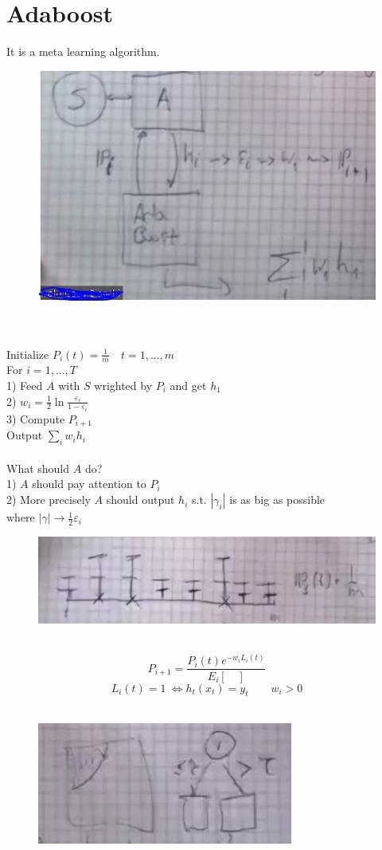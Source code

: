 \documentclass[../main.tex]{subfiles}
\begin{document}
\section{Adaboost}
It is a meta learning algorithm.
\begin{figure}[h]
    \centering
    \includegraphics[width=0.5\linewidth]{../img/lez23-img2.JPG}
    \caption{}
\end{figure}\\
\\
Initialize $P_i(t) = \frac{1}{m} \quad t=1,...,m$\\
For $i = 1,...,T$\\
1) Feed $A$ with $S$ wrighted by $P_i$ and get $h_1$\\
2) $w_i = \frac{1}{2} \ln \frac{\varepsilon_i}{1-\varepsilon_i}$
\\
3) Compute $P_{i+1}$
\\
Output $\sum_i w_i h_i$
\\\\
What should $A$ do? \\
1) $A$ should pay attention to $P_i$ \\
2) More precisely $A$ should output $h_i$ s.t. $|\gamma_i|$ is as big as possible  \\ where $ | \gamma | \rightarrow \frac{1}{2} \varepsilon_i$ 
\begin{figure}[h]
    \centering
    \includegraphics[width=0.5\linewidth]{../img/lez23-img3.JPG}
    \caption{}
\end{figure}\\
$$
P_{i+1}= \frac{P_i(t) e^{-w_i L_i(t)} }{E_i[ \quad ]}
$$
$$
L_i(t) = 1 \ \Leftrightarrow h_t(x_t) = y_t \qquad w_i > 0
$$ 
\\
\begin{figure}[h]
    \centering
    \includegraphics[width=0.3\linewidth]{../img/lez23-img4.JPG}
    \caption{}
\end{figure}\\
\end{document}
